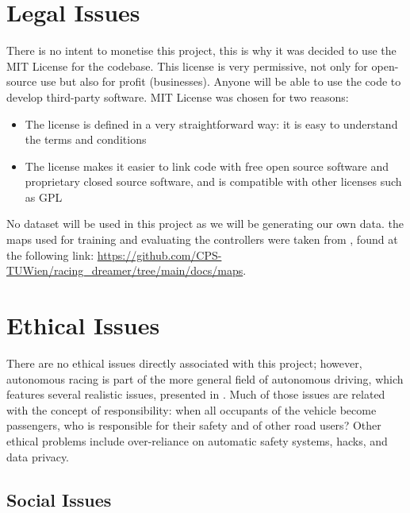 \section{Legal Issues}
\label{legiss}
There is no intent to monetise this project, this is why it was decided to use the MIT License for the codebase. This license is very permissive, not only for open-source use but also for profit (businesses). Anyone will be able to use the code to develop third-party software. MIT License was chosen for two reasons:
\begin{itemize}
	\item The license is defined in a very straightforward way: it is easy to understand the terms and conditions
	\item The license makes it easier to link code with free open source software and proprietary closed source software, and is compatible with other licenses such as GPL
\end{itemize}
No dataset will be used in this project as we will be generating our own data. the maps used for training and evaluating the controllers were taken from \cite{brunnbauer2022latent}, found at the following link: \url{https://github.com/CPS-TUWien/racing_dreamer/tree/main/docs/maps}.

\section{Ethical Issues}
\label{ethiss}
There are no ethical issues directly associated with this project; however, autonomous racing is part of the more general field of autonomous driving, which features several realistic issues, presented in \cite{ethical}. Much of those issues are related with the concept of responsibility: when all occupants of the vehicle become passengers, who is responsible for their safety and of other road users? Other ethical problems include over-reliance on automatic safety systems, hacks, and data privacy. 
\subsection{Social Issues}
\label{sociss}

